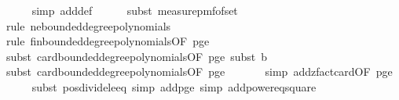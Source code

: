 \begin{isabellebody}
\ \ \ \ \isamarkupfalse%
\ {\isacharparenleft}{\kern0pt}simp\ add{\isacharcolon}{\kern0pt}{\isasymOmega}{\isacharunderscore}{\kern0pt}def{\isacharparenright}{\kern0pt}\isanewline
\ \ \ \ \isamarkupfalse%
\ {\isacharparenleft}{\kern0pt}subst\ measure{\isacharunderscore}{\kern0pt}pmf{\isacharunderscore}{\kern0pt}of{\isacharunderscore}{\kern0pt}set{\isacharparenright}{\kern0pt}\ \isanewline
\ \ \ \ \ \ \ \ \isamarkupfalse%
\ {\isacharparenleft}{\kern0pt}rule\ ne{\isacharunderscore}{\kern0pt}bounded{\isacharunderscore}{\kern0pt}degree{\isacharunderscore}{\kern0pt}polynomials{\isacharparenright}{\kern0pt}\isanewline
\ \ \ \ \ \ \isamarkupfalse%
\ {\isacharparenleft}{\kern0pt}rule\ fin{\isacharunderscore}{\kern0pt}bounded{\isacharunderscore}{\kern0pt}degree{\isacharunderscore}{\kern0pt}polynomials{\isacharbrackleft}{\kern0pt}OF\ p{\isacharunderscore}{\kern0pt}ge{\isacharunderscore}{\kern0pt}{}{\isacharbrackright}{\kern0pt}{\isacharparenright}{\kern0pt}\isanewline
\ \ \ \ \isamarkupfalse%
\ {\isacharparenleft}{\kern0pt}subst\ card{\isacharunderscore}{\kern0pt}bounded{\isacharunderscore}{\kern0pt}degree{\isacharunderscore}{\kern0pt}polynomials{\isacharbrackleft}{\kern0pt}OF\ p{\isacharunderscore}{\kern0pt}ge{\isacharunderscore}{\kern0pt}{}{\isacharbrackright}{\kern0pt}{\isacharcomma}{\kern0pt}\ subst\ b{}{\isacharparenright}{\kern0pt}\isanewline
\ \ \ \ \isamarkupfalse%
\ {\isacharparenleft}{\kern0pt}subst\ card{\isacharunderscore}{\kern0pt}bounded{\isacharunderscore}{\kern0pt}degree{\isacharunderscore}{\kern0pt}polynomials{\isacharbrackleft}{\kern0pt}OF\ p{\isacharunderscore}{\kern0pt}ge{\isacharunderscore}{\kern0pt}{}{\isacharbrackright}{\kern0pt}{\isacharparenright}{\kern0pt}\ \isanewline
\ \ \ \ \isamarkupfalse%
\ {\isacharparenleft}{\kern0pt}simp\ add{\isacharcolon}{\kern0pt}zfact{\isacharunderscore}{\kern0pt}card{\isacharbrackleft}{\kern0pt}OF\ p{\isacharunderscore}{\kern0pt}ge{\isacharunderscore}{\kern0pt}{}{\isacharbrackright}{\kern0pt}{\isacharparenright}{\kern0pt}\isanewline
\ \ \ \ \isamarkupfalse%
\ {\isacharparenleft}{\kern0pt}subst\ pos{\isacharunderscore}{\kern0pt}divide{\isacharunderscore}{\kern0pt}le{\isacharunderscore}{\kern0pt}eq{\isacharcomma}{\kern0pt}\ simp\ add{\isacharcolon}{\kern0pt}p{\isacharunderscore}{\kern0pt}ge{\isacharunderscore}{\kern0pt}{}{\isacharcomma}{\kern0pt}\ simp\ add{\isacharcolon}{\kern0pt}power{}{\isacharunderscore}{\kern0pt}eq{\isacharunderscore}{\kern0pt}square{\isacharparenright}{\kern0pt}\isanewline

\end{isabellebody}
